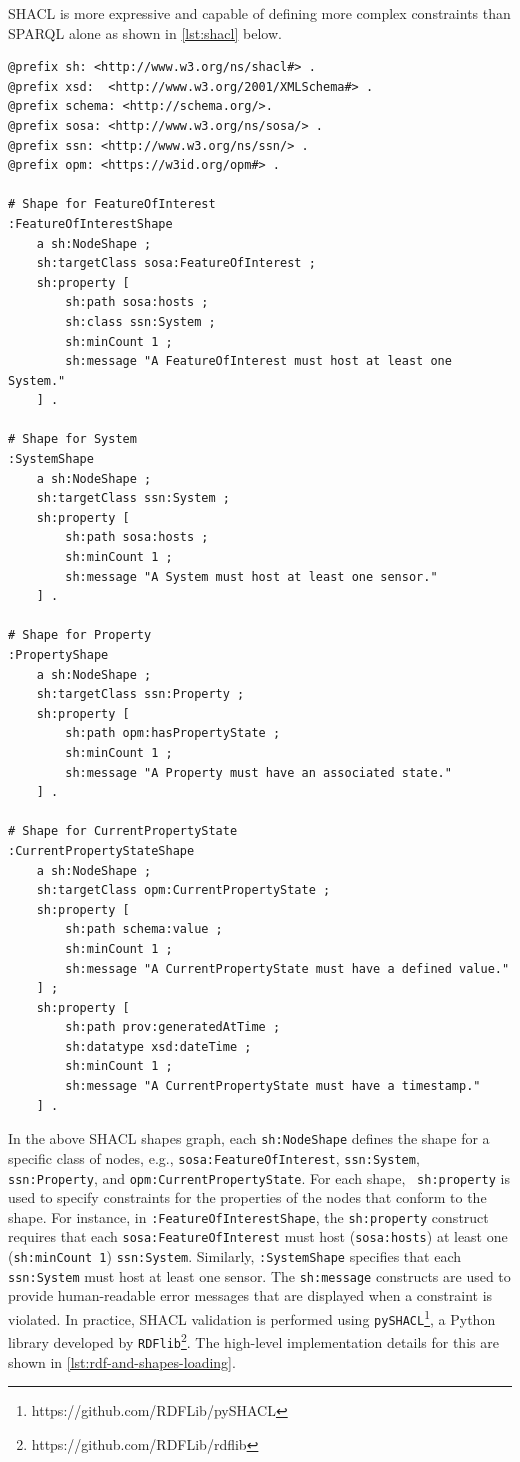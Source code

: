 \noindent \ac{SHACL} is more expressive and capable of defining more complex constraints than \ac{SPARQL} alone as shown in \autoref{lst:shacl} below.

\begin{lstlisting}[language=N3, caption={\ac{SHACL} shapes to express the same constraints defined in listings \ref{lst:validation1} - \ref{lst:validation4}}, label=lst:shacl]
@prefix sh: <http://www.w3.org/ns/shacl#> .
@prefix xsd:  <http://www.w3.org/2001/XMLSchema#> .
@prefix schema: <http://schema.org/>.
@prefix sosa: <http://www.w3.org/ns/sosa/> .
@prefix ssn: <http://www.w3.org/ns/ssn/> .
@prefix opm: <https://w3id.org/opm#> .

# Shape for FeatureOfInterest
:FeatureOfInterestShape
    a sh:NodeShape ;
    sh:targetClass sosa:FeatureOfInterest ;
    sh:property [
        sh:path sosa:hosts ;
        sh:class ssn:System ;
        sh:minCount 1 ;
        sh:message "A FeatureOfInterest must host at least one System."
    ] .

# Shape for System
:SystemShape
    a sh:NodeShape ;
    sh:targetClass ssn:System ;
    sh:property [
        sh:path sosa:hosts ;
        sh:minCount 1 ;
        sh:message "A System must host at least one sensor."
    ] .

# Shape for Property
:PropertyShape
    a sh:NodeShape ;
    sh:targetClass ssn:Property ;
    sh:property [
        sh:path opm:hasPropertyState ;
        sh:minCount 1 ;
        sh:message "A Property must have an associated state."
    ] .

# Shape for CurrentPropertyState
:CurrentPropertyStateShape
    a sh:NodeShape ;
    sh:targetClass opm:CurrentPropertyState ;
    sh:property [
        sh:path schema:value ;
        sh:minCount 1 ;
        sh:message "A CurrentPropertyState must have a defined value."
    ] ;
    sh:property [
        sh:path prov:generatedAtTime ;
        sh:datatype xsd:dateTime ;
        sh:minCount 1 ;
        sh:message "A CurrentPropertyState must have a timestamp."
    ] .

\end{lstlisting}

\noindent In the above \ac{SHACL} shapes graph, each \texttt{sh:NodeShape} defines the shape for a specific class of nodes, e.g., \texttt{sosa:FeatureOfInterest}, \texttt{ssn:System}, \texttt{ssn:Property}, and \texttt{opm:CurrentPropertyState}. For each shape, \texttt{ sh:property} is used to specify constraints for the properties of the nodes that conform to the shape.
For instance, in \texttt{:FeatureOfInterestShape}, the \texttt{sh:property} construct requires that each \texttt{sosa:FeatureOfInterest} must host (\texttt{sosa:hosts}) at least one (\texttt{sh:minCount 1}) \texttt{ssn:System}. Similarly, \texttt{:SystemShape} specifies that each \texttt{ssn:System} must host at least one sensor. The \texttt{sh:message} constructs are used to provide human-readable error messages that are displayed when a constraint is violated. In practice, \ac{SHACL} validation is performed using \texttt{pySHACL}\footnote{https://github.com/RDFLib/pySHACL}, a Python library developed by \texttt{RDFlib}\footnote{https://github.com/RDFLib/rdflib}. The high-level implementation details for this are shown in \autoref{lst:rdf-and-shapes-loading}.

